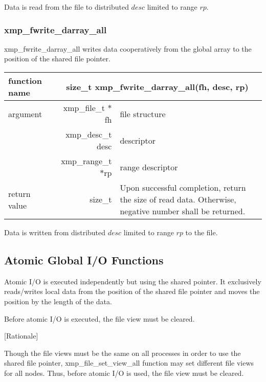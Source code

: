    Data is read from the file to distributed $desc$ limited to range $rp$.

   \subsubsection{xmp\_fwrite\_darray\_all}
   xmp\_fwrite\_darray\_all writes data cooperatively from the global array to the
   position of the shared file pointer.

   \begin{table}[h]
    \begin{center}
     \begin{tabular}{|l|r|p{80mm}|}
      \hline
      {\bf function name}  & \multicolumn{2}{c|}{\bf size\_t
      xmp\_fwrite\_darray\_all(fh, desc, rp)} \\ \hline \hline
      argument & xmp\_file\_t $*$fh & file structure \\ \cline{2-3}
      & xmp\_desc\_t desc & descriptor \\ \cline{2-3}
      & xmp\_range\_t $*$rp & range descriptor \\ \hline
      return value & size\_t & Upon successful completion, return the size
	      of read data. Otherwise, negative number shall be
	      returned. \\ \hline
      \end{tabular}
     \end{center}
    \label{tb:aaa}
   \end{table}

   Data is written from distributed $desc$ limited to range $rp$ to the file.


   \subsection{Atomic Global I/O Functions}

   Atomic I/O is executed independently but using the shared pointer. 
   It exclusively reads/writes local data
   from the position of the shared file pointer and moves the position by the length of the data.

   Before atomic I/O is executed, the file view must be cleared.
   
   [Rationale]

   Though the file views must be the same on all processes in order to use the shared file pointer,
   xmp\_file\_set\_view\_all
   function may set different file views for all nodes.
   Thus, before atomic I/O is used, the file view must be cleared.

